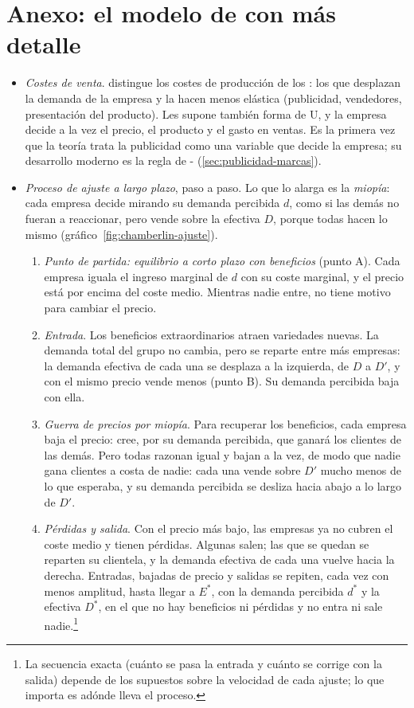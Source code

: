 \documentclass[11pt]{article}
\begin{document}
\section{Anexo: el modelo de  con más detalle}\label{anexo:chamberlin}

\begin{itemize}
\item \emph{Costes de venta}. \textcite{Chamberlin1933Theory} distingue los costes de producción de los : los que desplazan la demanda de la empresa y la hacen menos elástica (publicidad, vendedores, presentación del producto). Les supone también forma de U, y la empresa decide a la vez el precio, el producto y el gasto en ventas. Es la primera vez que la teoría trata la publicidad como una variable que decide la empresa; su desarrollo moderno es la regla de - (\ref{sec:publicidad-marcas}).
\item \emph{Proceso de ajuste a largo plazo}, paso a paso\nocite{Koutsoyiannis1979Modern}. Lo que lo alarga es la \emph{miopía}: cada empresa decide mirando su demanda percibida $d$, como si las demás no fueran a reaccionar, pero vende sobre la efectiva $D$, porque todas hacen lo mismo (gráfico~\ref{fig:chamberlin-ajuste}).
  \begin{enumerate}
  \item \emph{Punto de partida: equilibrio a corto plazo con beneficios} (punto A). Cada empresa iguala el ingreso marginal de $d$ con su coste marginal, y el precio está por encima del coste medio. Mientras nadie entre, no tiene motivo para cambiar el precio.
  \item \emph{Entrada}. Los beneficios extraordinarios atraen variedades nuevas. La demanda total del grupo no cambia, pero se reparte entre más empresas: la demanda efectiva de cada una se desplaza a la izquierda, de $D$ a $D'$, y con el mismo precio vende menos (punto B). Su demanda percibida baja con ella.
  \item \emph{Guerra de precios por miopía}. Para recuperar los beneficios, cada empresa baja el precio: cree, por su demanda percibida, que ganará los clientes de las demás. Pero todas razonan igual y bajan a la vez, de modo que nadie gana clientes a costa de nadie: cada una vende sobre $D'$ mucho menos de lo que esperaba, y su demanda percibida se desliza hacia abajo a lo largo de $D'$.
  \item \emph{Pérdidas y salida}. Con el precio más bajo, las empresas ya no cubren el coste medio y tienen pérdidas. Algunas salen; las que se quedan se reparten su clientela, y la demanda efectiva de cada una vuelve hacia la derecha. Entradas, bajadas de precio y salidas se repiten, cada vez con menos amplitud, hasta llegar a $E^*$, con la demanda percibida $d^*$ y la efectiva $D^*$, en el que no hay beneficios ni pérdidas y no entra ni sale nadie.\footnote{La secuencia exacta (cuánto se pasa la entrada y cuánto se corrige con la salida) depende de los supuestos sobre la velocidad de cada ajuste; lo que importa es adónde lleva el proceso.}

\end{enumerate}
\end{itemize}
\end{document}
